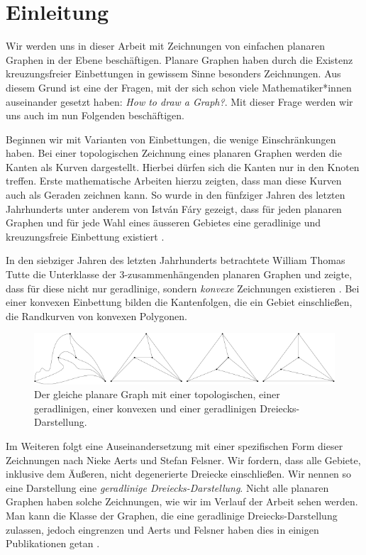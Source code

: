 \chapter{Einleitung}
Wir werden uns in dieser Arbeit mit Zeichnungen von einfachen planaren Graphen in der Ebene beschäftigen. Planare Graphen haben durch die Existenz kreuzungsfreier Einbettungen in gewissem Sinne besonders \grqq{ } Zeichnungen. Aus diesem Grund ist eine der Fragen, mit der sich schon viele Mathematiker*innen auseinander gesetzt haben: \glqq\textit{How to draw a Graph?}\grqq\cite{tutte63}. Mit dieser Frage werden wir uns auch im nun Folgenden beschäftigen. 

Beginnen wir mit Varianten von Einbettungen, die wenige Einschränkungen haben. Bei einer topologischen Zeichnung eines planaren Graphen werden die Kanten als Kurven dargestellt. Hierbei dürfen sich die Kanten nur in den Knoten treffen. Erste mathematische Arbeiten hierzu zeigten, dass man diese Kurven auch als Geraden zeichnen kann. So wurde in den fünfziger Jahren des letzten Jahrhunderts unter anderem von István Fáry gezeigt, dass für jeden planaren Graphen und für jede Wahl eines äusseren Gebietes eine geradlinige und kreuzungsfreie Einbettung existiert \cite{fary48}.

In den siebziger Jahren des letzten Jahrhunderts betrachtete William Thomas Tutte die Unterklasse der 3-zusam\-men\-hängenden planaren Graphen und zeigte, dass für diese nicht nur geradlinige, sondern \textit{konvexe} Zeichnungen existieren \cite{tutte63}. Bei einer konvexen Einbettung bilden die Kantenfolgen, die ein Gebiet einschließen, die Randkurven von konvexen Polygonen.

\begin{figure}[h]
	\centering
  \includegraphics[width=1\textwidth]{topo_straight_convex.png}
	\caption{Der gleiche planare Graph mit einer topologischen, einer ge\-rad\-lini\-gen, einer konvexen und einer geradlinigen Dreiecks-Darstellung.}
	\label{topo_straight_convex}
\end{figure}

Im Weiteren folgt eine Auseinandersetzung mit einer spezifischen Form dieser Zeichnungen nach Nieke Aerts und Stefan Felsner. Wir fordern, dass alle Gebiete, inklusive dem Äußeren, nicht degenerierte Dreiecke einschließen. Wir nennen so eine Darstellung eine \textit{geradlinige Dreiecks-Darstellung}. Nicht alle planaren Graphen haben solche Zeichnungen, wie wir im Verlauf der Arbeit sehen werden. Man kann die Klasse der Graphen, die eine geradlinige Dreiecks-Darstellung zulassen, jedoch eingrenzen und Aerts und Felsner haben dies in einigen Publikationen getan \cite{af13h,af13,af15}.

